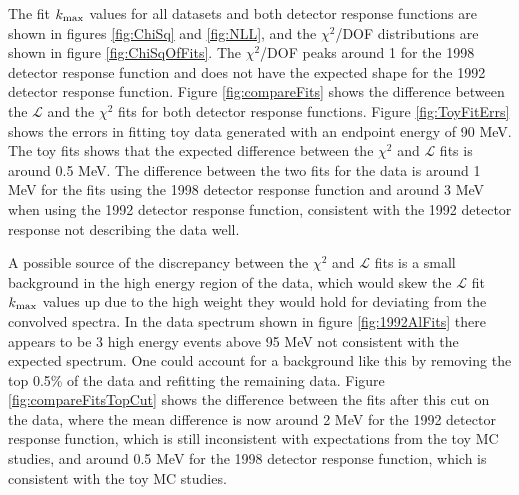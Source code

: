 The fit $\mbox{$k_{\rm max}$}$ values for all 
datasets and both detector response functions are shown in figures \ref{fig:ChiSq} and \ref{fig:NLL}, and the $\chi^2$/DOF
distributions are shown in figure \ref{fig:ChiSqOfFits}. 
The $\chi^2$/DOF peaks around 1 for the 1998 detector response 
function and does not have the expected shape for the 1992 detector response function. Figure \ref{fig:compareFits}
shows the difference between the $\mathcal{L}$ and the $\chi^2$ fits for both detector response functions.
Figure \ref{fig:ToyFitErrs} shows the errors in fitting toy data generated with
an endpoint energy of 90 MeV. The toy fits shows that the expected difference between the $\chi^2$ and $\mathcal{L}$ fits 
is around 0.5 MeV. The difference between the two fits for the data is around 1 MeV for the fits using the 1998 detector 
response function and around 3 MeV when using the 1992 detector response function, consistent with the 1992 detector response 
not describing the data well. 

A possible source of the discrepancy between the $\chi^2$ and $\mathcal{L}$ fits is a small background 
in the high energy region of the data, which would skew the $\mathcal{L}$ fit $\mbox{$k_{\rm max}$}$ values up due to the high weight they would hold for deviating
from the convolved spectra. In the data spectrum shown in figure \ref{fig:1992AlFits} there appears to be 3 high energy events above 95 MeV
not consistent with the expected spectrum. One could account for a background like this by removing the top 0.5\% of the data and refitting the remaining
data. Figure \ref{fig:compareFitsTopCut} shows the difference between the fits after this cut on the data, where the 
mean difference is now around 2 MeV for the 1992 detector response function, which is still inconsistent with expectations from
the toy MC studies, and around 0.5 MeV for the 1998 detector response function, which is consistent with the toy MC studies.



